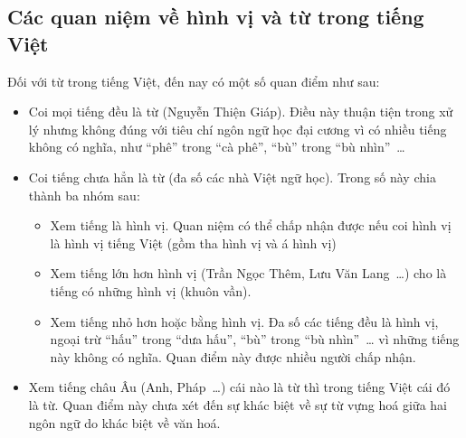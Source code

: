 \documentclass[a4paper,oneside,14pt]{extbook} %
\begin{document}


\subsection{Các quan niệm về hình vị và từ trong tiếng Việt}

Đối với từ trong tiếng Việt, đến nay có một số quan điểm như sau:
\begin{itemize}
\item Coi mọi tiếng đều là từ (Nguyễn Thiện Giáp). Điều này thuận tiện
  trong xử lý nhưng không đúng với tiêu chí ngôn ngữ học đại cương vì
  có nhiều tiếng không có nghĩa, như ``phê'' trong ``cà phê'', ``bù''
  trong ``bù nhìn''~\ldots{}
\item Coi tiếng chưa hẳn là từ (đa số các nhà Việt ngữ học). Trong số
  này chia thành ba nhóm sau:
  \begin{itemize}
  \item Xem tiếng là hình vị. Quan niệm có thể chấp nhận được nếu coi
    hình vị là hình vị tiếng Việt (gồm tha hình vị và á hình vị)
  \item Xem tiếng lớn hơn hình vị (Trần Ngọc Thêm, Lưu Văn
    Lang~\ldots{}) cho là tiếng có những hình vị (khuôn vần).
  \item Xem tiếng nhỏ hơn hoặc bằng hình vị. Đa số các tiếng đều là
  hình vị, ngoại trừ ``hấu'' trong ``dưa hấu'', ``bù'' trong ``bù
  nhìn''~\ldots{} vì những tiếng này không có nghĩa. Quan điểm này được
  nhiều người chấp nhận.
  \end{itemize}
\item Xem tiếng châu Âu (Anh, Pháp~\ldots{}) cái nào là từ thì trong
  tiếng Việt cái đó là từ. Quan điểm này chưa xét đến sự khác biệt về
  sự từ vựng hoá giữa hai ngôn ngữ do khác biệt về văn hoá.
\end{itemize}
\end{document}
